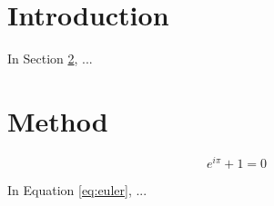 \documentclass{article}
\begin{document}
\section{Introduction}
\label{sec:intro}

In Section \ref{sec:method}, ...

\section{Method}
\label{sec:method}

\begin{equation}
\label{eq:euler}
e^{i\pi} + 1 = 0
\end{equation}

In Equation \ref{eq:euler}, ...
\end{document}
